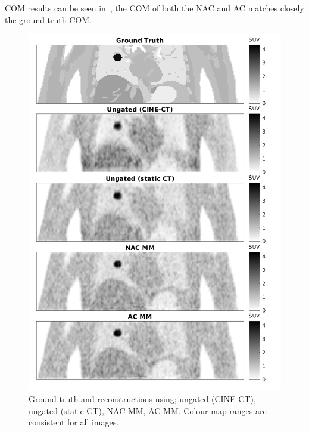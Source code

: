     \gls{COM} results can be seen in~, the \gls{COM} of both the \gls{NAC} and \gls{AC} matches closely the ground truth \gls{COM}.
    
    \begin{figure}
        \centering
        
        \includegraphics[width=1.0\linewidth]{figures/visual_analysis.png}
        
        
        \captionsetup{singlelinecheck=false, justification=centering}
        \caption{Ground truth and reconstructions using; ungated (CINE-\gls{CT}), ungated (static \gls{CT}), \gls{NAC} \gls{MM}, \gls{AC} \gls{MM}. Colour map ranges are consistent for all images.}
        
        \label{fig:visual_analysis}
        
    \end{figure}
    
